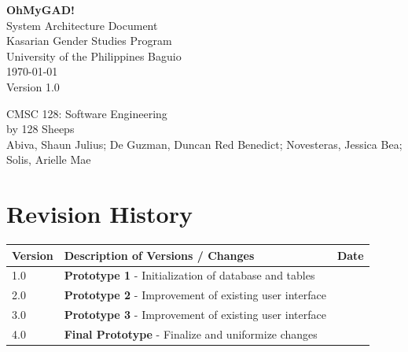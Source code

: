 \documentclass[11pt,a4paper]{article}
\author{\textbf{Project Architecture Team}}
\date{\small\color{textgray}\today}
\begin{document}
\begin{titlepage}
  \centering
  \vspace*{3cm}

  {\Huge\bfseries\textcolor{upindigo}{OhMyGAD!}}\\[0.4cm]
  
  {\LARGE\textcolor{upindigo}{System Architecture Document}}\\[1.5cm]

  {\large Kasarian Gender Studies Program}\\[0.5cm]
  {\large University of the Philippines Baguio}\\[2cm]

  \textcolor{textgray}{\today}\\[0.5cm]
  \textcolor{textgray}{Version 1.0}

  \vfill
  {\small CMSC 128: Software Engineering}\\
  {\small by 128 Sheeps}\\
  {\small Abiva, Shaun Julius; De Guzman, Duncan Red Benedict; Novesteras, Jessica Bea; Solis, Arielle Mae}
\end{titlepage}

\newpage
\section*{Revision History}

\begin{table}[h!]
\centering
\small
\renewcommand{\arraystretch}{1.5} 
\setlength{\tabcolsep}{8pt}      
\begin{tabular}{|p{1.5cm}|p{9.5cm}|p{2.5cm}|}
\hline
\textbf{Version} & \textbf{Description of Versions / Changes} & \textbf{Date} \\ \hline
1.0 & \textbf{Prototype 1} \newline
      - Initialization of database and tables & \\ \hline
2.0 & \textbf{Prototype 2} \newline
      - Improvement of existing user interface & \\ \hline
3.0 & \textbf{Prototype 3} \newline
      - Improvement of existing user interface & \\ \hline
4.0 & \textbf{Final Prototype} \newline
      - Finalize and uniformize changes & \\ \hline
\end{tabular}
\end{table}
\end{document}
